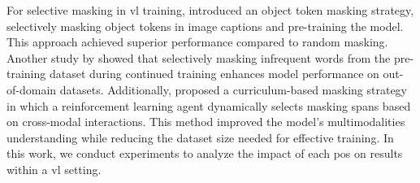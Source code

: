 For selective masking in \acrshort{vl} training,  introduced an object token masking strategy, selectively masking object tokens in image captions and pre-training the model.  
This approach achieved superior performance compared to random masking.  
Another study by  showed that selectively masking infrequent words from the pre-training dataset during continued training enhances model performance on out-of-domain datasets.  
Additionally, \cite{rf-curriculum-masking} proposed a curriculum-based masking strategy in which a reinforcement learning agent dynamically selects masking spans based on cross-modal interactions.  
This method improved the model’s multimodalities understanding while reducing the dataset size needed for effective training.  
In this work, we conduct experiments to analyze the impact of each \acrshort{pos} on results within a \acrshort{vl} setting.  





